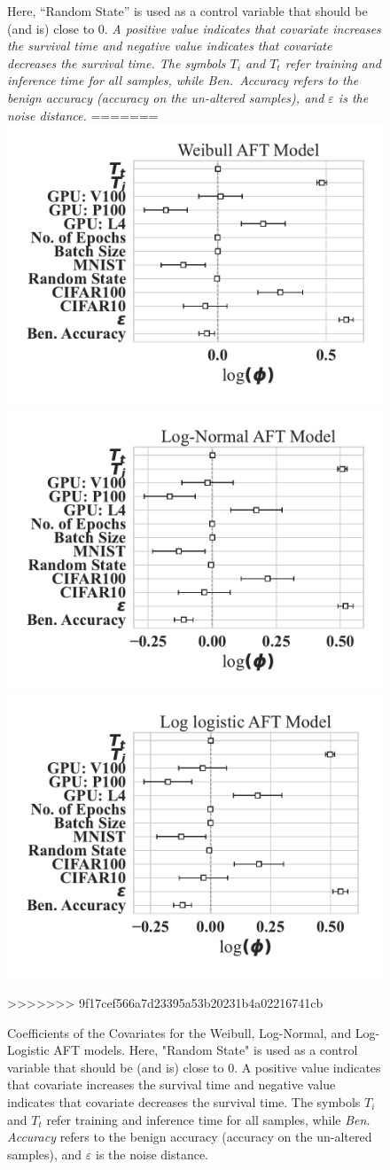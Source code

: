 \documentclass[sn-mathphys-num]{sn-jnl}%
\newcommand{\cm}[1]{\textit{{\color{blue}#1}}}
\begin{document}
\begin{figure}[tph!]
{    Here, ``Random State'' is used as a control variable that should be (and is) close to 0.
    \cm{A positive value indicates that covariate increases the survival time and negative value indicates that covariate decreases the survival time.
    The symbols $T_i$ and $T_t$ refer training and inference time for all samples, while \textit{Ben.~Accuracy} refers to the benign accuracy (accuracy on the un-altered samples), and $\varepsilon$ is the noise distance.}}
=======
        \includegraphics[width=.49\textwidth]{plots/combined/weibull_aft.pdf}
        \includegraphics[width=.49\textwidth]{plots/combined/log_normal_aft.pdf}
        \includegraphics[width=.49\textwidth]{plots/combined/log_logistic_aft.pdf}
    \caption{Coefficients of the Covariates for the Weibull, Log-Normal, and Log-Logistic AFT models. Here, "Random State" is used as a control variable that should be (and is) close to 0. A positive value indicates that covariate increases the survival time and negative value indicates that covariate decreases the survival time. The symbols $T_i$ and $T_t$ refer training and inference time for all samples, while \textit{Ben. Accuracy} refers to the benign accuracy (accuracy on the un-altered samples), and $\varepsilon$ is the noise distance.}
>>>>>>> 9f17cef566a7d23395a53b20231b4a02216741cb
    \label{fig:aft}
\end{figure}
\end{document}
